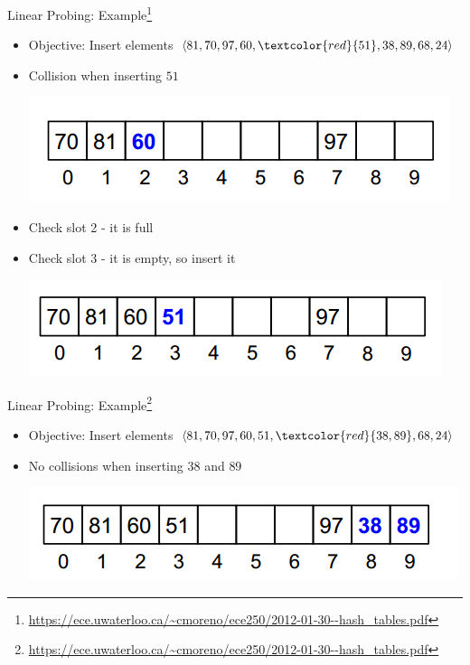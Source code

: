 \documentclass{beamer}
\begin{document}
\begin{frame}{Linear Probing: Example\footnote{\url{https://ece.uwaterloo.ca/~cmoreno/ece250/2012-01-30--hash_tables.pdf}}}
    \begin{itemize}
        \item Objective: Insert elements $\langle 81, 70, 97, 60, \textcolor{red}{51}, 38, 89, 68, 24 \rangle$ 
        \item Collision when inserting $51$ 
        \begin{center}
            \includegraphics[scale=0.5]{linearProbing3.png} \pause
        \end{center}
        \item Check slot 2 - it is full
        \item Check slot 3 - it is empty, so insert it
        \begin{center}
            \includegraphics[scale=0.5]{linearProbing4.png}
        \end{center}
    \end{itemize}
\end{frame}

\begin{frame}{Linear Probing: Example\footnote{\url{https://ece.uwaterloo.ca/~cmoreno/ece250/2012-01-30--hash_tables.pdf}}}
    \begin{itemize}
        \item Objective: Insert elements $\langle 81, 70, 97, 60, 51, \textcolor{red}{38, 89}, 68, 24 \rangle$ 
        \item No collisions when inserting $38$ and $89$
        \begin{center}
            \includegraphics[scale=0.5]{linearProbing5.png} 
        \end{center}
    \end{itemize}
\end{frame}
\end{document}
